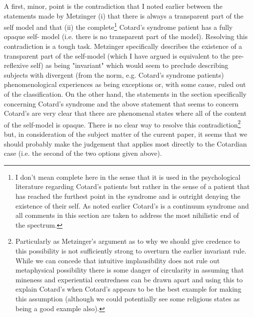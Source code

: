 A first, minor, point is the contradiction that I noted earlier between the statements made by Metzinger (i) that there is always a transparent part of the self model and that (ii) the complete\footnote{I don't mean complete here in the sense that it is used in the psychological literature regarding Cotard's patients but rather in the sense of a patient that has reached the furthest point in the syndrome and is outright denying the existence of their self. As noted earlier Cotard's is a continuum syndrome and all comments in this section are taken to address the most nihilistic end of the spectrum.} Cotard's syndrome patient has a fully opaque self- model (i.e. there is no transparent part of the model). Resolving this contradiction is a tough task. Metzinger specifically describes the existence of a transparent part of the self-model (which I have argued is equivalent to the pre-reflexive self) as being "invariant" which would seem to preclude describing subjects with divergent (from the norm, e.g. Cotard's syndrome patients) phenomenological experiences as being exceptions or, with some cause, ruled out of the classification. On the other hand, the statements in the section specifically concerning Cotard's syndrome and the above statement that seems to concern Cotard's are very clear that there are phenomenal states where all of the content of the self-model is opaque. There is no clear way to resolve this contradiction\footnote{Particularly as Metzinger's argument as to why we should give credence to this possibility is not sufficiently strong to overturn the earlier invariant rule. While we can concede that intuitive implausibility does not rule out metaphysical possibility there is some danger of circularity in assuming that mineness and experiential centredness can be drawn apart and using this to explain Cotard's when Cotard's appears to be the best example for making this assumption (although we could potentially see some religious states as being a good example also).} but, in consideration of the subject matter of the current paper, it seems that we should probably make the judgement that applies most directly to the Cotardian case (i.e. the second of the two options given above).

